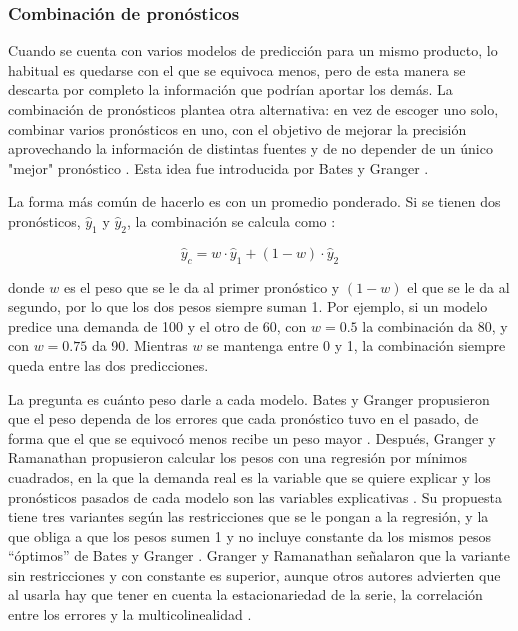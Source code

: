     \subsubsection{Combinación de pronósticos}

    Cuando se cuenta con varios modelos de predicción para un mismo producto, lo habitual es quedarse con el que se equivoca menos, pero de esta manera se descarta por completo la información que podrían aportar los demás. La combinación de pronósticos plantea otra alternativa: en vez de escoger uno solo, combinar varios pronósticos en uno, con el objetivo de mejorar la precisión aprovechando la información de distintas fuentes y de no depender de un único "mejor" pronóstico \cite{wang2023combinations}. Esta idea fue introducida por Bates y Granger \cite{bates1969combination}.

    La forma más común de hacerlo es con un promedio ponderado. Si se tienen dos pronósticos, $\hat{y}_1$ y $\hat{y}_2$, la combinación se calcula como \cite{bates1969combination}:

    \begin{equation}
    \hat{y}_c = w \cdot \hat{y}_1 + (1 - w) \cdot \hat{y}_2
    \end{equation}

    donde $w$ es el peso que se le da al primer pronóstico y $(1 - w)$ el que se le da al segundo, por lo que los dos pesos siempre suman 1. Por ejemplo, si un modelo predice una demanda de 100 y el otro de 60, con $w = 0.5$ la combinación da 80, y con $w = 0.75$ da 90. Mientras $w$ se mantenga entre 0 y 1, la combinación siempre queda entre las dos predicciones.

    La pregunta es cuánto peso darle a cada modelo. Bates y Granger propusieron que el peso dependa de los errores que cada pronóstico tuvo en el pasado, de forma que el que se equivocó menos recibe un peso mayor \cite{bates1969combination}. Después, Granger y Ramanathan propusieron calcular los pesos con una regresión por mínimos cuadrados, en la que la demanda real es la variable que se quiere explicar y los pronósticos pasados de cada modelo son las variables explicativas \cite{granger1984improved, wang2023combinations}. Su propuesta tiene tres variantes según las restricciones que se le pongan a la regresión, y la que obliga a que los pesos sumen 1 y no incluye constante da los mismos pesos ``óptimos'' de Bates y Granger \cite{wang2023combinations}. Granger y Ramanathan señalaron que la variante sin restricciones y con constante es superior, aunque otros autores advierten que al usarla hay que tener en cuenta la estacionariedad de la serie, la correlación entre los errores y la multicolinealidad \cite{wang2023combinations}.

